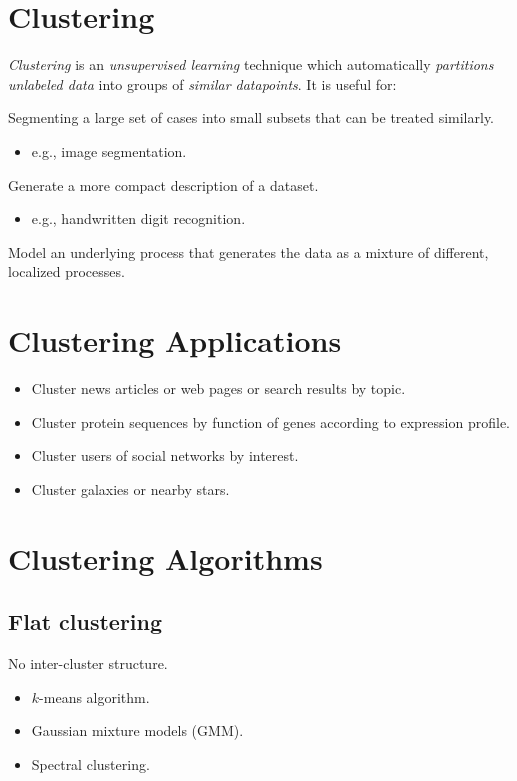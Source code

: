 \documentclass[
	number={6},
	title={Clustering}
]{cs584notes}
\begin{document}
\section{Clustering}\label{sec:clustering}
\emph{Clustering} is an \emph{unsupervised learning} technique which automatically \emph{partitions unlabeled data} into groups of \emph{similar datapoints}.
It is useful for:
\begin{description}[font=\emph]
	\item[Segmentation] Segmenting a large set of cases into small subsets that can be treated similarly.
	\begin{itemize}
		\item e.g., image segmentation.
	\end{itemize}
	\item[Compression] Generate a more compact description of a dataset.
	\begin{itemize}
		\item e.g., handwritten digit recognition.
	\end{itemize}
	\item[Representation] Model an underlying process that generates the data as a mixture of different, localized processes.
\end{description}

\section{Clustering Applications}\label{sec:clustering-applications}
\begin{itemize}
	\item Cluster news articles or web pages or search results by topic.
	\item Cluster protein sequences by function of genes according to expression profile.
	\item Cluster users of social networks by interest.
	\item Cluster galaxies or nearby stars.
\end{itemize}

\section{Clustering Algorithms}\label{sec:clustering-algorithms}
\subsection{Flat clustering}\label{subsec:flat-clustering}
No inter-cluster structure.
\begin{itemize}
	\item $k$-means algorithm.
	\item Gaussian mixture models (GMM).
	\item Spectral clustering.
\end{itemize}
\end{document}
